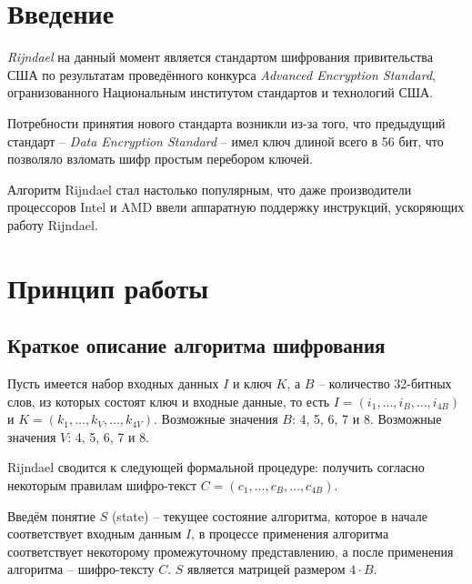 \section{Введение}

    \textit{Rijndael} на данный момент является стандартом шифрования привительства США по
    результатам проведённого конкурса \textit{Advanced Encryption Standard}, огранизованного
    Национальным институтом стандартов и технологий США.

    Потребности принятия нового стандарта возникли из-за того, что предыдущий стандарт --
    \textit{Data Encryption Standard} -- имел ключ длиной всего в 56 бит, что позволяло взломать
    шифр простым перебором ключей.

    Алгоритм Rijndael стал настолько популярным, что даже производители процессоров Intel и AMD
    ввели аппаратную поддержку инструкций, ускоряющих работу Rijndael.

\section{Принцип работы}
\subsection{Краткое описание алгоритма шифрования}

    Пусть имеется набор входных данных $I$ и ключ $K$, а $B$ -- количество 32-битных слов, из которых
    состоят ключ и входные данные, то есть $I = (i_1, \dots, i_{B}, \dots, i_{4B})$ и
    $K = (k_1, \dots, k_{V}, \dots, k_{4V})$.
    Возможные значения $B$: 4, 5, 6, 7 и 8. Возможные значения $V$: 4, 5, 6, 7 и 8.

    Rijndael сводится к следующей формальной процедуре: получить согласно некоторым правилам
    шифро-текст $C = (c_1, \dots, c_{B}, \dots, c_{4B})$.

    Введём понятие $S$ (state) -- текущее состояние алгоритма, которое в начале соответствует входным данным $I$,
    в процессе применения алгоритма соответствует некоторому промежуточному представлению,
    а после применения алгоритма -- шифро-тексту $C$. $S$ является матрицей размером $4 \cdot B$.

